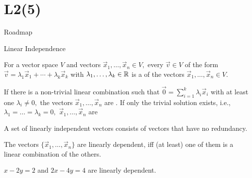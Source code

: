 \documentclass[fleqn,aspectratio=169]{beamer}
\begin{document}
\section{L2(5)}
\begin{frame}{Roadmap}

\plitemsep 0.1in

\bce[(5)] 
\item {}

\item {}

\item {}
\ece
\end{frame}

\begin{frame}{Linear Independence}

\plitemsep 0.1in

\bci 
\item {} For a vector space $V$ and vectors $\vec{x}_1, \ldots, \vec{x}_n \in V,$ every $\vec{v} \in V$ of the form
$
\vec{v} = \lambda_1 \vec{x}_1 + \cdots + \lambda_k \vec{x}_k
$
with $\lambda_1, \ldots, \lambda_k \in {\mathbb R}$ is a  of the vectors  $\vec{x}_1, \ldots, \vec{x}_n \in V.$
\item {} If there is a non-trivial linear combination such that $\vec{0}=\sum_{i=1}^k \lambda_i \vec{x}_i$ with at least one $\lambda_i \neq 0,$ the vectors $\vec{x}_1, \ldots, \vec{x}_n$ are . If only the trivial solution exists, i.e., $\lambda_1 = \ldots = \lambda_k =0,$ $\vec{x}_1, \ldots, \vec{x}_n$ are 

\item {} A set of linearly independent vectors consists of vectors that have no redundancy.  

\item {} The vectors $\{\vec{x}_1, \ldots, \vec{x}_n \}$ are linearly dependent, iff
(at least) one of them is a linear combination of the others. 
\bci
\item $x-2y = 2$ and $2x-4y=4$ are linearly dependent. 
\eci

\eci


\end{frame}
\end{document}
